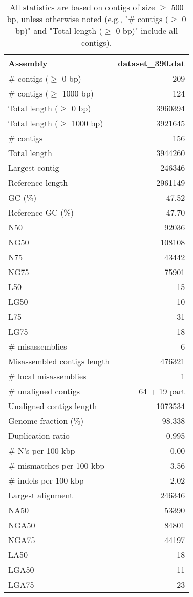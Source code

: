 \documentclass[12pt,a4paper]{article}
\begin{document}
\begin{table}[ht]
\begin{center}
\caption{All statistics are based on contigs of size $\geq$ 500 bp, unless otherwise noted (e.g., "\# contigs ($\geq$ 0 bp)" and "Total length ($\geq$ 0 bp)" include all contigs).}
\begin{tabular}{|l*{1}{|r}|}
\hline
Assembly & dataset\_390.dat \\ \hline
\# contigs ($\geq$ 0 bp) & 209 \\ \hline
\# contigs ($\geq$ 1000 bp) & 124 \\ \hline
Total length ($\geq$ 0 bp) & 3960394 \\ \hline
Total length ($\geq$ 1000 bp) & 3921645 \\ \hline
\# contigs & 156 \\ \hline
Total length & 3944260 \\ \hline
Largest contig & 246346 \\ \hline
Reference length & 2961149 \\ \hline
GC (\%) & 47.52 \\ \hline
Reference GC (\%) & 47.70 \\ \hline
N50 & 92036 \\ \hline
NG50 & 108108 \\ \hline
N75 & 43442 \\ \hline
NG75 & 75901 \\ \hline
L50 & 15 \\ \hline
LG50 & 10 \\ \hline
L75 & 31 \\ \hline
LG75 & 18 \\ \hline
\# misassemblies & 6 \\ \hline
Misassembled contigs length & 476321 \\ \hline
\# local misassemblies & 1 \\ \hline
\# unaligned contigs & 64 + 19 part \\ \hline
Unaligned contigs length & 1073534 \\ \hline
Genome fraction (\%) & 98.338 \\ \hline
Duplication ratio & 0.995 \\ \hline
\# N's per 100 kbp & 0.00 \\ \hline
\# mismatches per 100 kbp & 3.56 \\ \hline
\# indels per 100 kbp & 2.02 \\ \hline
Largest alignment & 246346 \\ \hline
NA50 & 53390 \\ \hline
NGA50 & 84801 \\ \hline
NGA75 & 44197 \\ \hline
LA50 & 18 \\ \hline
LGA50 & 11 \\ \hline
LGA75 & 23 \\ \hline
\end{tabular}
\end{center}
\end{table}
\end{document}

